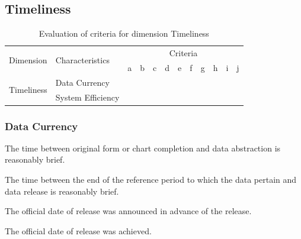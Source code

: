 \subsection{Timeliness}

\begin{table}[htbp]
    \centering

    \begin{tabular}{llrrrrrrrrrr}
        \toprule
        \multirow{2}{*}{Dimension}  & \multirow{2}{*}{Characteristics}  & \multicolumn{10}{c}{Criteria}         \\ \cmidrule(lr){3-12}
                                    &                                   & a & b & c & d & e & f & g & h & i & j \\ \midrule
        \multirow{2}{*}{Timeliness} & Data Currency                     &   &   &   &   &   &   &   &   &   &   \\
                                    & System Efficiency                 &   &   &   &   &   &   &   &   &   &   \\
        \bottomrule
    \end{tabular}

    \caption{Evaluation of criteria for dimension Timeliness}
    \label{table:timeliness-benchmark}
\end{table}
\FloatBarrier

\subsubsection{Data Currency}

\begin{QandA}
    \item The time between original form or chart completion and data abstraction is reasonably brief.
    \begin{answered}
        
    \end{answered}

    \item The time between the end of the reference period to which the data pertain and data release is reasonably brief.
    \begin{answered}
        
    \end{answered}

    \item The official date of release was announced in advance of the release.
    \begin{answered}
        
    \end{answered}

    \item The official date of release was achieved.
    \begin{answered}
        
    \end{answered}

\end{QandA}

